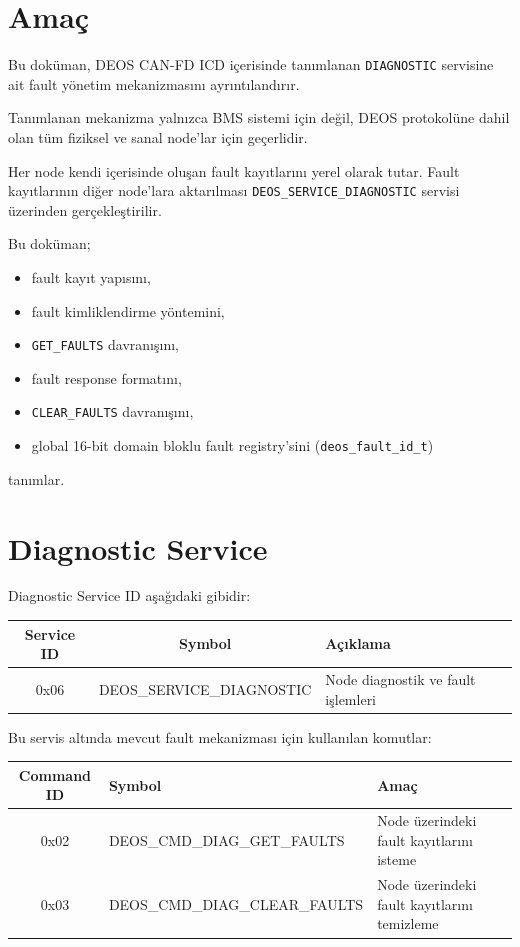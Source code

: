 \documentclass[a4paper,11pt]{article}
\newcommand{\code}[1]{\texttt{#1}}
\begin{document}
\section{Amaç}

Bu doküman, DEOS CAN-FD ICD içerisinde tanımlanan
\texttt{DIAGNOSTIC} servisine ait fault yönetim mekanizmasını
ayrıntılandırır.

Tanımlanan mekanizma yalnızca BMS sistemi için değil,
DEOS protokolüne dahil olan tüm fiziksel ve sanal node'lar için
geçerlidir.

Her node kendi içerisinde oluşan fault kayıtlarını yerel olarak tutar.
Fault kayıtlarının diğer node'lara aktarılması
\texttt{DEOS\_SERVICE\_DIAGNOSTIC} servisi üzerinden gerçekleştirilir.

Bu doküman;

\begin{itemize}
    \item fault kayıt yapısını,
    \item fault kimliklendirme yöntemini,
    \item \texttt{GET\_FAULTS} davranışını,
    \item fault response formatını,
    \item \texttt{CLEAR\_FAULTS} davranışını,
    \item global 16-bit domain bloklu fault registry'sini (\code{deos\_fault\_id\_t})
\end{itemize}

tanımlar.

\section{Diagnostic Service}

Diagnostic Service ID aşağıdaki gibidir:

\begin{center}
\begin{tabular}{c c l}
\toprule
\textbf{Service ID} & \textbf{Symbol} & \textbf{Açıklama} \\
\midrule
0x06 & DEOS\_SERVICE\_DIAGNOSTIC & Node diagnostik ve fault işlemleri \\
\bottomrule
\end{tabular}
\end{center}

Bu servis altında mevcut fault mekanizması için kullanılan komutlar:

\begin{center}
\begin{tabular}{c l l}
\toprule
\textbf{Command ID} & \textbf{Symbol} & \textbf{Amaç} \\
\midrule
0x02 & DEOS\_CMD\_DIAG\_GET\_FAULTS   & Node üzerindeki fault kayıtlarını isteme \\
0x03 & DEOS\_CMD\_DIAG\_CLEAR\_FAULTS & Node üzerindeki fault kayıtlarını temizleme \\
\bottomrule
\end{tabular}
\end{center}
\end{document}
